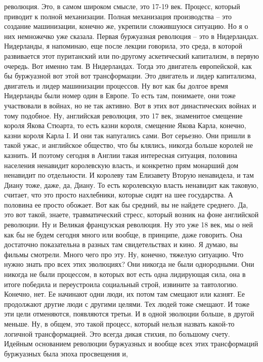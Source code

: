 революция. Это, в самом широком смысле, это 17-19 век. Процесс, который приводит
к полной механизации. Полная механизация производства – это создание
машинизации, конечно же, укрепили сложившуюся ситуацию. Но я о них немножечко
уже сказала. Первая буржуазная революция – это в Нидерландах. Нидерланды, я
напоминаю, еще после лекции говорила, это среда, в которой развивается этот
пуританский или по-другому аскетический капитализм, в первую очередь. Вот именно
там. В Нидерландах. Тогда это двигатель европейской, как бы буржуазной вот этой
вот трансформации. Это двигатель и лидер капитализма, двигатель и лидер
машинизации процессов. Ну вот как бы долгое время Нидерланды были номер один в
Европе. То есть там, понимаете, они тоже участвовали в войнах, но не так
активно. Вот в этих вот династических войнах и тому подобное. Ну, английская
революция, это 17 век, знаменитое смещение короля Якова Стюарта, то есть казни
короля, смещение Якова Карла, конечно, казни короля Карла I. И они так
напугались сами. Вот серьезно. Они пришли в такой ужас, и английское общество,
что бы клялись, никогда больше королей не казнить. И поэтому сегодня в Англии
такая интересная ситуация, половина населения ненавидит королевскую власть, и
конкретно прям монарший дом ненавидит по отдельности. И королеву там Елизавету
Вторую ненавидела, и там Диану тоже, даже, да, Диану. То есть королевскую власть
ненавидит как таковую, считает, что это просто нахлебники, которые сидят на шее
государства. А половина ее просто обожает. Вот как бы средний, вы не найдете
среднего. Да, это вот такой, знаете, травматический стресс, который возник на
фоне английской революции. Ну и Великая французская революция. Ну это уже 18
век, мы о ней как бы не будем сегодня много или вообще, в принципе, даже
говорить. Она достаточно показательна в разных там свидетельствах и кино. Я
думаю, вы фильмы смотрели. Много чего про эту. Ну, конечно, тяжелую ситуацию.
Что нужно знать про всех этих эволюциях? Они никогда не были однородными. Они
никогда не были процессом, в которых вот есть одна лидирующая сила, она в итоге
победила и переустроила социальный строй, извините за тавтологию. Конечно, нет.
Ее начинают одни люди, их потом там смещают или казнят. Ее продолжают другие
люди с другими целями. Тех людей тоже смещают. И тоже эти цели отменяются,
появляются третьи. И в одной эволюции больше, в другой меньше. Ну, в общем, это
такой процесс, который нельзя назвать какой-то логичной трансформацией. Это
всегда дикая стихия, по большому счету. Идейным основанием революции буржуазных
и вообще всех этих трансформаций буржуазных была эпоха просвещения и,
